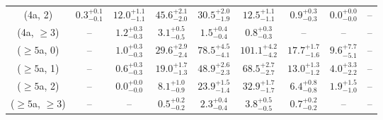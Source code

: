 \begin{table}[h!]
{\begin{tabular}{ccccccccc}
	(4a, 2) & $0.3^{+ 0.1 }_{- 0.1 }$ & $12.0^{+ 1.1 }_{- 1.1 }$ & $45.6^{+ 2.1 }_{- 2.0 }$ & $30.5^{+ 2.0 }_{- 1.9 }$ & $12.5^{+ 1.1 }_{- 1.1 }$ & $0.9^{+ 0.3 }_{- 0.3 }$ & $0.0^{+ 0.0 }_{- 0.0 }$ & -- \\[0.5ex] 
	(4a, $\ge3$) & -- & $1.2^{+ 0.3 }_{- 0.3 }$ & $3.1^{+ 0.5 }_{- 0.5 }$ & $1.5^{+ 0.4 }_{- 0.4 }$ & $0.8^{+ 0.3 }_{- 0.3 }$ & -- & -- & -- \\[0.5ex] 
	($\ge5$a, 0) & -- & $1.0^{+ 0.3 }_{- 0.3 }$ & $29.6^{+ 2.9 }_{- 2.4 }$ & $78.5^{+ 4.5 }_{- 4.1 }$ & $101.1^{+ 4.2 }_{- 4.2 }$ & $17.7^{+ 1.7 }_{- 1.6 }$ & $9.6^{+ 7.7 }_{- 5.1 }$ & -- \\[0.5ex] 
	($\ge5$a, 1) & -- & $0.6^{+ 0.3 }_{- 0.3 }$ & $19.0^{+ 1.7 }_{- 1.3 }$ & $48.9^{+ 2.6 }_{- 2.3 }$ & $68.5^{+ 2.7 }_{- 2.7 }$ & $13.0^{+ 1.3 }_{- 1.2 }$ & $4.0^{+ 3.3 }_{- 2.2 }$ & -- \\[0.5ex] 
	($\ge5$a, 2) & -- & $0.0^{+ 0.0 }_{- 0.0 }$ & $8.1^{+ 1.0 }_{- 0.9 }$ & $23.9^{+ 1.5 }_{- 1.4 }$ & $32.9^{+ 1.7 }_{- 1.7 }$ & $6.4^{+ 0.8 }_{- 0.8 }$ & $1.9^{+ 1.5 }_{- 1.0 }$ & -- \\[0.5ex] 
	($\ge5$a, $\ge3$) & -- & -- & $0.5^{+ 0.2 }_{- 0.2 }$ & $2.3^{+ 0.4 }_{- 0.4 }$ & $3.8^{+ 0.5 }_{- 0.5 }$ & $0.7^{+ 0.2 }_{- 0.2 }$ & -- & -- \\[0.5ex] 
	\hline
	\hline
\end{tabular}}
\end{table}
